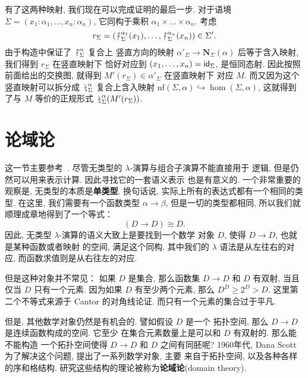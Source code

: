 有了这两种映射, 我们现在可以完成证明的最后一步.
对于语境 \(\Sigma = (x_1{:}\alpha_1, \dots, x_n{:}\alpha_n)\),
它同构于乘积 \(\alpha_1 \times \dots \times \alpha_n\).
考虑 \[r_\Sigma = (\Reflect_\Sigma^{\alpha_1}(x_1), \dots, \Reflect_\Sigma^{\alpha_n}(x_n)) \in \Sigma'.\]
由于构造中保证了 \(\Reflect_\Sigma^\alpha\) 复合上
竖直方向的映射 \(\alpha'_\Sigma \to \mathbf N_\Sigma(\alpha)\)
后等于含入映射, 我们得到 \(r_\Sigma\) 在竖直映射下
恰好对应到 \((x_1, \dots, x_n) = \textnormal{\textsf{id}}_\Sigma\),
是恒同态射. 因此按照前面给出的交换图, 就得到
\(M'(r_\Sigma) \in \alpha'_\Sigma\) 在竖直映射下
对应 \(M\). 而又因为这个竖直映射可以拆分成 \(\Reify_\Sigma^\alpha\)
复合上含入映射 \(\mathrm{nf}(\Sigma, \alpha) \hookrightarrow \hom(\Sigma, \alpha)\),
这就得到了与 \(M\) 等价的正规形式 \(\Reify_\Sigma^\alpha(M'(r_\Sigma))\).

\section{论域论}\label{beginning:domain}

这一节主要参考~\cites{abramsky:1995:domain}{cartwright:2016:domain}.
尽管无类型的 \(\lambda\)-演算与组合子演算不能直接用于
逻辑, 但是仍然可以用来表示计算. 因此寻找它的一套语义表示
也是有意义的. 一个非常重要的观察是, 无类型的本质是\textbf{单类型}.
换句话说, 实际上所有的表达式都有一个相同的类型.
在这里, 我们需要有一个函数类型 \(\alpha \to \beta\),
但是一切的类型都相同, 所以我们就顺理成章地得到了一个等式：
\[(D \to D) \cong D.\]
因此, 无类型 \(\lambda\)-演算的语义大致上是要找到一个数学
对象 \(D\), 使得 \(D \to D\), 也就是某种函数或者映射
的空间, 满足这个同构. 其中我们的 \(\lambda\)
语法是从左往右的对应, 而函数求值则是从右往左的对应.

但是这种对象并不常见： 如果 \(D\) 是集合, 那么函数集
\(D \to D\)
和 \(D\) 有双射, 当且仅当 \(D\) 只有一个元素. 因为如果
\(D\) 有至少两个元素, 那么
\(D^D \ge 2^D > D\).
这里第二个不等式来源于 Cantor 的对角线论证.
而只有一个元素的集合过于平凡.

但是, 其他数学对象仍然是有机会的. 譬如假设 \(D\) 是一个
拓扑空间, 那么 \(D \to D\) 是连续函数构成的空间. 它至少
在集合元素数量上是可以和 \(D\) 有双射的. 那么能不能构造
一个拓扑空间使得 \(D \to D\) 和 \(D\) 之间有同胚呢?
1960年代, Dana Scott 为了解决这个问题, 提出了一系列数学对象, 主要
来自于拓扑空间, 以及各种各样的序和格结构.
研究这些结构的理论被称为\textbf{论域论}(domain theory).

